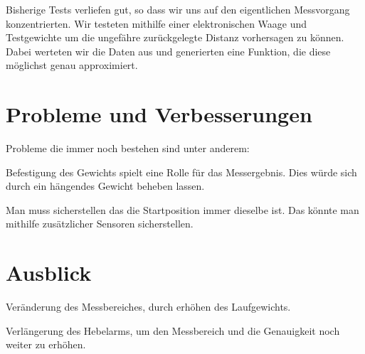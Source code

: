 Bisherige Tests verliefen gut, so dass wir uns auf den eigentlichen Messvorgang konzentrierten. Wir testeten mithilfe einer elektronischen Waage und Testgewichte um die ungefähre zurückgelegte Distanz vorhersagen zu können. Dabei werteten wir die Daten aus und generierten eine Funktion, die diese möglichst genau approximiert.\hypertarget{index_sec_5}{}\section{Probleme und Verbesserungen}\label{index_sec_5}
Probleme die immer noch bestehen sind unter anderem\-:
\begin{DoxyItemize}
\item Befestigung des Gewichts spielt eine Rolle für das Messergebnis. Dies würde sich durch ein hängendes Gewicht beheben lassen.
\item Man muss sicherstellen das die Startposition immer dieselbe ist. Das könnte man mithilfe zusätzlicher Sensoren sicherstellen.
\end{DoxyItemize}\hypertarget{index_sec_6}{}\section{Ausblick}\label{index_sec_6}

\begin{DoxyItemize}
\item Veränderung des Messbereiches, durch erhöhen des Laufgewichts.
\item Verlängerung des Hebelarms, um den Messbereich und die Genauigkeit noch weiter zu erhöhen. 
\end{DoxyItemize}